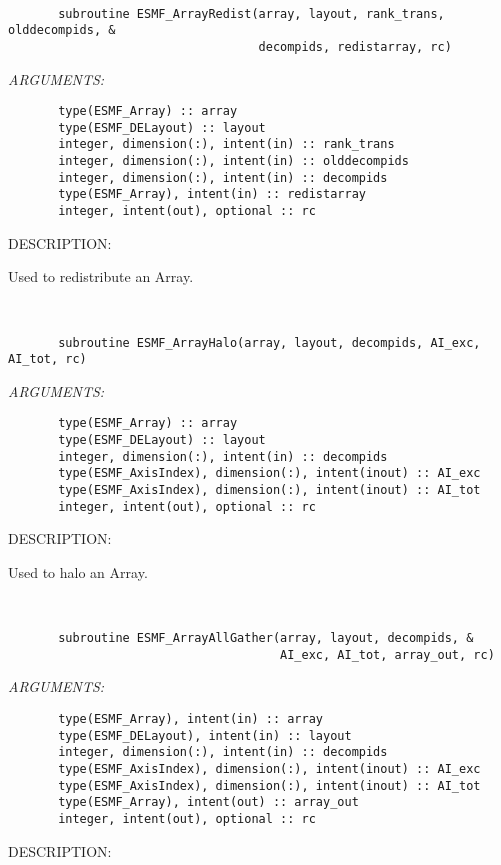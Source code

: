 \mbox{}\hrulefill\ 
 

\begin{verbatim}       subroutine ESMF_ArrayRedist(array, layout, rank_trans, olddecompids, &
                                   decompids, redistarray, rc)\end{verbatim}{\em ARGUMENTS:}
\begin{verbatim}       type(ESMF_Array) :: array
       type(ESMF_DELayout) :: layout
       integer, dimension(:), intent(in) :: rank_trans
       integer, dimension(:), intent(in) :: olddecompids
       integer, dimension(:), intent(in) :: decompids
       type(ESMF_Array), intent(in) :: redistarray
       integer, intent(out), optional :: rc\end{verbatim}
{\sf DESCRIPTION:\\ }


   Used to redistribute an Array.
  
   
 
\mbox{}\hrulefill\ 
 

\begin{verbatim}       subroutine ESMF_ArrayHalo(array, layout, decompids, AI_exc, AI_tot, rc)\end{verbatim}{\em ARGUMENTS:}
\begin{verbatim}       type(ESMF_Array) :: array
       type(ESMF_DELayout) :: layout
       integer, dimension(:), intent(in) :: decompids
       type(ESMF_AxisIndex), dimension(:), intent(inout) :: AI_exc
       type(ESMF_AxisIndex), dimension(:), intent(inout) :: AI_tot
       integer, intent(out), optional :: rc\end{verbatim}
{\sf DESCRIPTION:\\ }


   Used to halo an Array.
  
   
 
\mbox{}\hrulefill\ 
 

\begin{verbatim}       subroutine ESMF_ArrayAllGather(array, layout, decompids, &
                                      AI_exc, AI_tot, array_out, rc)\end{verbatim}{\em ARGUMENTS:}
\begin{verbatim}       type(ESMF_Array), intent(in) :: array
       type(ESMF_DELayout), intent(in) :: layout
       integer, dimension(:), intent(in) :: decompids
       type(ESMF_AxisIndex), dimension(:), intent(inout) :: AI_exc
       type(ESMF_AxisIndex), dimension(:), intent(inout) :: AI_tot
       type(ESMF_Array), intent(out) :: array_out
       integer, intent(out), optional :: rc\end{verbatim}
{\sf DESCRIPTION:\\ }


